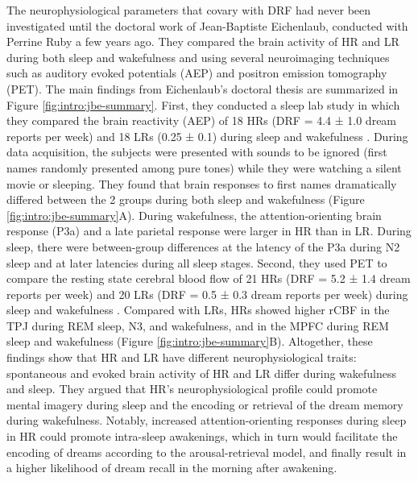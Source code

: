 The neurophysiological parameters that covary with DRF had never been investigated until the doctoral work of Jean-Baptiste Eichenlaub, conducted with Perrine Ruby a few years ago. They compared the brain activity of HR and LR during both sleep and wakefulness and using several neuroimaging techniques such as auditory evoked potentials (AEP) and positron emission tomography (PET). The main findings from Eichenlaub’s doctoral thesis are summarized in Figure \ref{fig:intro:jbe-summary}.
First, they conducted a sleep lab study in which they compared the brain reactivity (AEP) of 18 HRs (DRF = 4.4 ± 1.0 dream reports per week) and 18 LRs (0.25 ± 0.1) during sleep and wakefulness \citep{eichenlaub_brain_2014}. During data acquisition, the subjects were presented with sounds to be ignored (first names randomly presented among pure tones) while they were watching a silent movie or sleeping. They found that brain responses to first names dramatically differed between the 2 groups during both sleep and wakefulness (Figure \ref{fig:intro:jbe-summary}A). During wakefulness, the attention-orienting brain response (P3a) and a late parietal response were larger in HR than in LR. During sleep, there were between-group differences at the latency of the P3a during N2 sleep and at later latencies during all sleep stages.
Second, they used PET to compare the resting state cerebral blood flow of 21 HRs (DRF = 5.2 ± 1.4 dream reports per week) and 20 LRs (DRF = 0.5 ± 0.3 dream reports per week) during sleep and wakefulness \citep{eichenlaub_resting_2014}. Compared with LRs, HRs showed higher rCBF in the TPJ during REM sleep, N3, and wakefulness, and in the MPFC during REM sleep and wakefulness (Figure \ref{fig:intro:jbe-summary}B).
Altogether, these findings show that HR and LR have different neurophysiological traits: spontaneous and evoked brain activity of HR and LR differ during wakefulness and sleep. They argued that HR’s neurophysiological profile could promote mental imagery during sleep and the encoding or retrieval of the dream memory during wakefulness. Notably, increased attention-orienting responses during sleep in HR could promote intra-sleep awakenings, which in turn would facilitate the encoding of dreams according to the arousal-retrieval model, and finally result in a higher likelihood of dream recall in the morning after awakening.

